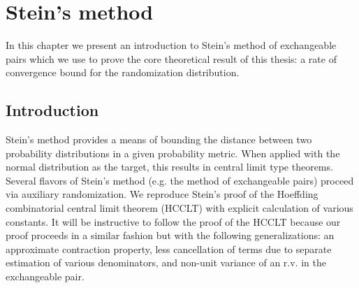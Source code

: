 \chapter{Stein's method}
\label{C:steins-method}
In this chapter we present an introduction to Stein's method of exchangeable pairs which we use to
prove the core theoretical result of this thesis: a rate of convergence bound for the randomization
distribution.

\section{Introduction}
\label{S:steins-method-introduction}
Stein's method provides a means of bounding the distance between two probability distributions in a
given probability metric.  When applied with the normal distribution as the target, this results in
central limit type theorems.  Several flavors of Stein's method (e.g. the method of exchangeable
pairs) proceed via auxiliary randomization.  We reproduce Stein's proof of the Hoeffding
combinatorial central limit theorem (HCCLT) with explicit calculation of various constants.  It will
be instructive to follow the proof of the HCCLT because our proof proceeds in a similar fashion but
with the following generalizations: an approximate contraction property, less cancellation of terms
due to separate estimation of various denominators, and non-unit variance of an r.v. in the
exchangeable pair.

